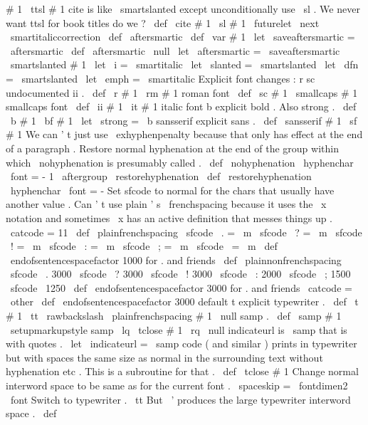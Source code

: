 {{{#
1
{
{
\
ttsl
#
1
}
}
%
cite
is
like
\
smartslanted
except
unconditionally
use
\
sl
.
We
never
want
%
ttsl
for
book
titles
do
we
?
\
def
\
cite
#
1
{
{
\
sl
#
1
}
\
futurelet
\
next
\
smartitaliccorrection
}
\
def
\
aftersmartic
{
}
\
def
\
var
#
1
{
%
\
let
\
saveaftersmartic
=
\
aftersmartic
\
def
\
aftersmartic
{
\
null
\
let
\
aftersmartic
=
\
saveaftersmartic
}
%
\
smartslanted
{
#
1
}
%
}
\
let
\
i
=
\
smartitalic
\
let
\
slanted
=
\
smartslanted
\
let
\
dfn
=
\
smartslanted
\
let
\
emph
=
\
smartitalic
%
Explicit
font
changes
:
r
sc
undocumented
ii
.
\
def
\
r
#
1
{
{
\
rm
#
1
}
}
%
roman
font
\
def
\
sc
#
1
{
{
\
smallcaps
#
1
}
}
%
smallcaps
font
\
def
\
ii
#
1
{
{
\
it
#
1
}
}
%
italic
font
%
b
explicit
bold
.
Also
strong
.
\
def
\
b
#
1
{
{
\
bf
#
1
}
}
\
let
\
strong
=
\
b
%
sansserif
explicit
sans
.
\
def
\
sansserif
#
1
{
{
\
sf
#
1
}
}
%
We
can
'
t
just
use
\
exhyphenpenalty
because
that
only
has
effect
at
%
the
end
of
a
paragraph
.
Restore
normal
hyphenation
at
the
end
of
the
%
group
within
which
\
nohyphenation
is
presumably
called
.
%
\
def
\
nohyphenation
{
\
hyphenchar
\
font
=
-
1
\
aftergroup
\
restorehyphenation
}
\
def
\
restorehyphenation
{
\
hyphenchar
\
font
=
-
}
%
Set
sfcode
to
normal
for
the
chars
that
usually
have
another
value
.
%
Can
'
t
use
plain
'
s
\
frenchspacing
because
it
uses
the
\
x
notation
and
%
sometimes
\
x
has
an
active
definition
that
messes
things
up
.
%
\
catcode
=
11
\
def
\
plainfrenchspacing
{
%
\
sfcode
\
.
=
\
m
\
sfcode
\
?
=
\
m
\
sfcode
\
!
=
\
m
\
sfcode
\
:
=
\
m
\
sfcode
\
;
=
\
m
\
sfcode
\
=
\
m
\
def
\
endofsentencespacefactor
{
1000
}
%
for
.
and
friends
}
\
def
\
plainnonfrenchspacing
{
%
\
sfcode
\
.
3000
\
sfcode
\
?
3000
\
sfcode
\
!
3000
\
sfcode
\
:
2000
\
sfcode
\
;
1500
\
sfcode
\
1250
\
def
\
endofsentencespacefactor
{
3000
}
%
for
.
and
friends
}
\
catcode
=
\
other
\
def
\
endofsentencespacefactor
{
3000
}
%
default
%
t
explicit
typewriter
.
\
def
\
t
#
1
{
%
{
\
tt
\
rawbackslash
\
plainfrenchspacing
#
1
}
%
\
null
}
%
samp
.
\
def
\
samp
#
1
{
{
\
setupmarkupstyle
{
samp
}
\
lq
\
tclose
{
#
1
}
\
rq
\
null
}
}
%
indicateurl
is
\
samp
that
is
with
quotes
.
\
let
\
indicateurl
=
\
samp
%
code
(
and
similar
)
prints
in
typewriter
but
with
spaces
the
same
%
size
as
normal
in
the
surrounding
text
without
hyphenation
etc
.
%
This
is
a
subroutine
for
that
.
\
def
\
tclose
#
1
{
%
{
%
%
Change
normal
interword
space
to
be
same
as
for
the
current
font
.
\
spaceskip
=
\
fontdimen2
\
font
%
%
Switch
to
typewriter
.
\
tt
%
%
But
\
'
produces
the
large
typewriter
interword
space
.
\
def
\
{
}}}}}}
